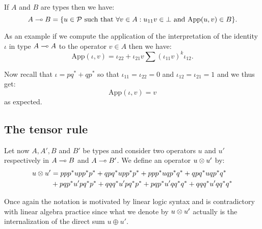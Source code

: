 \begin{corollary}
If $A$ and $B$ are types then we have:
\begin{equation*}
A\multimap B = \{u\in\mathcal{P} \text{ such that }\forall v\in A: u_{11}v\in\bot\text{ and } \mathrm{App}(u, v)\in B\}.
\end{equation*}
\end{corollary}

As an example if we compute the application of the interpretation of the
identity \(\iota\) in type \(A\multimap A\) to the operator \(v\in A\) then
we have:
\begin{equation*}
\mathrm{App}(\iota, v) = \iota_{22} + \iota_{21}v\sum(\iota_{11}v)^k\iota_{12}.
\end{equation*}

Now recall that \(\iota = pq^* + qp^*\) so that
\(\iota_{11} = \iota_{22} = 0\) and \(\iota_{12} = \iota_{21} = 1\) and
we thus get:
\begin{equation*}
\mathrm{App}(\iota, v) = v
\end{equation*}
as expected.

\subsection{The tensor rule}\label{the-tensor-rule}

Let now \(A, A', B\) and \(B'\) be types and consider two operators
\(u\) and \(u'\) respectively in \(A\multimap B\) and \(A\multimap B'\). We
define an operator \(u\otimes u'\) by:
\begin{align*}
    u\otimes u' &= ppp^*upp^*p^* + qpq^*upp^*p^* + ppp^*uqp^*q^* + qpq^*uqp^*q^*\\
              &+ pqp^*u'pq^*p^* + qqq^*u'pq^*p^* + pqp^*u'qq^*q^* + qqq^*u'qq^*q^*
  \end{align*}

Once again the notation is motivated by linear logic syntax and is
contradictory with linear algebra practice since what we denote by
\(u\otimes u'\) actually is the internalization of the direct sum
\(u\oplus u'\).

